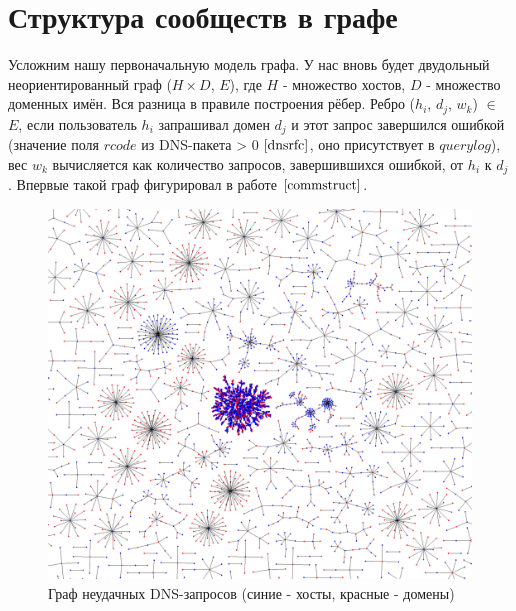 \documentclass[14pt]{extreport}
\begin{document}
	\section{Структура сообществ в графе}
	\label{ssec:communitystruct}
	Усложним нашу первоначальную модель графа. У нас вновь будет двудольный неориентированный граф ($H\times D$, $E$), где $H$ - множество хостов, $D$ - множество доменных имён. Вся разница в правиле построения рёбер. Ребро ($h_i$, $d_j$, $w_k$) $\in$ $E$, если пользователь $h_i$ запрашивал домен $d_j$ и этот запрос завершился ошибкой (значение поля $rcode$ из DNS-пакета > 0 $\cite{dnsrfc}$, оно присутствует в $querylog$), вес $w_k$ вычисляется как количество запросов, завершившихся ошибкой, от $h_i$ к $d_j$. Впервые такой граф фигурировал в работе $\cite{commstruct}$.
	\\
	\begin{figure}[H]
	\center
	\includegraphics[width=0.9\linewidth]{fail-graph.png}
	\caption{Граф неудачных DNS-запросов (синие - хосты, красные - домены)}
	
	\label{fig:subim1}
	\end{figure}
	
\end{document}
